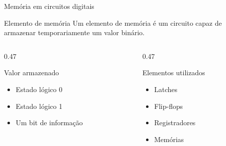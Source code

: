 
\begin{frame}{Memória em circuitos digitais}

    \begin{block}{Elemento de memória}
        Um elemento de memória é um circuito capaz de armazenar
        temporariamente um valor binário.
    \end{block}

    \begin{columns}[T]

        \begin{column}{0.47\textwidth}
            \begin{alertblock}{Valor armazenado}
                \begin{itemize}
                    \item Estado lógico 0
                    \item Estado lógico 1
                    \item Um bit de informação
                \end{itemize}
            \end{alertblock}
        \end{column}

        \begin{column}{0.47\textwidth}
            \begin{block}{Elementos utilizados}
                \begin{itemize}
                    \item Latches
                    \item Flip-flops
                    \item Registradores
                    \item Memórias
                \end{itemize}
            \end{block}
        \end{column}

    \end{columns}

\end{frame}